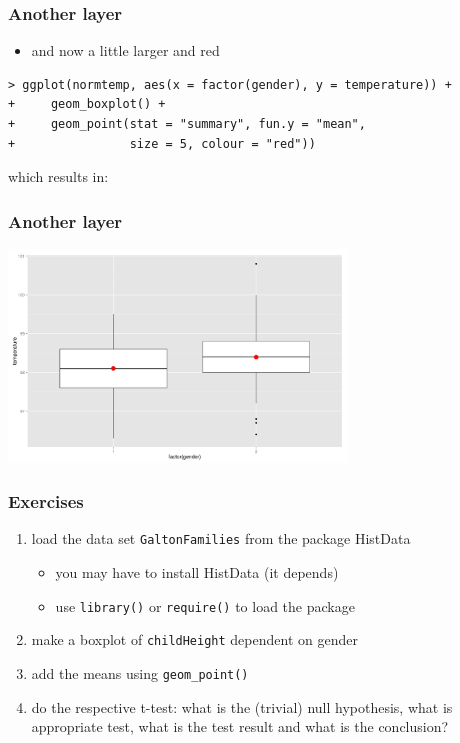 \documentclass[xcolor={table}]{beamer}
\begin{document}
\begin{frame}[fragile]\frametitle{Another layer}
  \begin{itemize}
  \item and now a little larger and red
  \end{itemize}\small
\begin{verbatim}
> ggplot(normtemp, aes(x = factor(gender), y = temperature)) +
+     geom_boxplot() +
+     geom_point(stat = "summary", fun.y = "mean",
+                size = 5, colour = "red"))
\end{verbatim}
which results in:
\end{frame}

\begin{frame}\frametitle{Another layer}
  \begin{center}
    \includegraphics[width=9cm]{boxplotmean2.png}
  \end{center}
\end{frame}


\begin{frame}[allowframebreaks]\frametitle{Exercises}
  \begin{enumerate}
  \item load the data set \texttt{GaltonFamilies} from the package HistData 
    \begin{itemize}
    \item you may have to install HistData (it depends)
    \item use \texttt{library()} or \texttt{require()} to load the package
    \end{itemize}
    \item make a boxplot of \texttt{childHeight} dependent on gender
    \item add the means using \texttt{geom\_point()}
    \item do the respective t-test: what is the (trivial) null hypothesis, what is appropriate test, what is the test result and what is the conclusion?
  \end{enumerate}
\end{frame}
\end{document}
